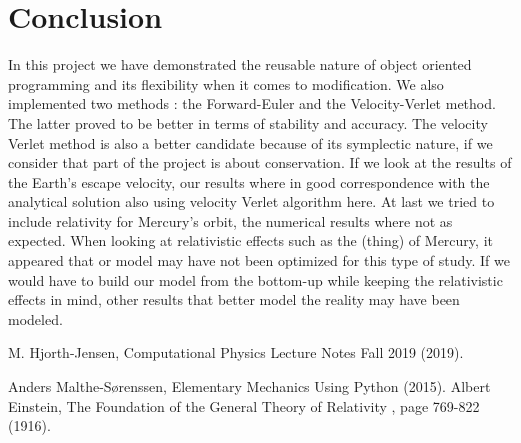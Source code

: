 \documentclass{article}
\begin{document}
\section{Conclusion}




In this project we have demonstrated the reusable nature of object oriented programming and its flexibility when it comes to modification. We also implemented two methods : the Forward-Euler and the Velocity-Verlet  method. The latter proved to be better  in terms of stability and accuracy. The velocity Verlet method is also a better candidate because of its symplectic nature, if we consider that part of the project is about conservation.  If we look at the results of the Earth's escape velocity, our results where in good correspondence with the analytical solution also using velocity Verlet algorithm here.
At last we tried to include relativity for Mercury's orbit, the numerical results where not as expected. When looking at relativistic effects such as the (thing) of Mercury, it appeared that or model may have not been optimized for this type of study. If we would have to build our model from the bottom-up while keeping the relativistic effects in mind, other results that better model the reality may have been modeled. 


\begin{thebibliography}{9}


 M. Hjorth-Jensen, Computational Physics Lecture Notes Fall 2019 (2019).

 Anders Malthe-Sørenssen, Elementary Mechanics Using Python (2015).
 Albert Einstein, The Foundation of the General Theory of Relativity , page 769-822 (1916).


\end{thebibliography}
\end{document}
